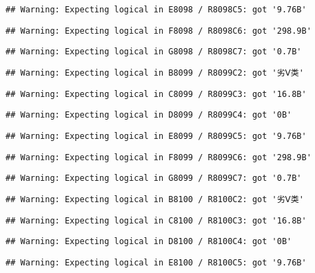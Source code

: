 \documentclass[
]{article}
\begin{document}
\begin{verbatim}
## Warning: Expecting logical in E8098 / R8098C5: got '9.76B'
\end{verbatim}

\begin{verbatim}
## Warning: Expecting logical in F8098 / R8098C6: got '298.9B'
\end{verbatim}

\begin{verbatim}
## Warning: Expecting logical in G8098 / R8098C7: got '0.7B'
\end{verbatim}

\begin{verbatim}
## Warning: Expecting logical in B8099 / R8099C2: got '劣Ⅴ类'
\end{verbatim}

\begin{verbatim}
## Warning: Expecting logical in C8099 / R8099C3: got '16.8B'
\end{verbatim}

\begin{verbatim}
## Warning: Expecting logical in D8099 / R8099C4: got '0B'
\end{verbatim}

\begin{verbatim}
## Warning: Expecting logical in E8099 / R8099C5: got '9.76B'
\end{verbatim}

\begin{verbatim}
## Warning: Expecting logical in F8099 / R8099C6: got '298.9B'
\end{verbatim}

\begin{verbatim}
## Warning: Expecting logical in G8099 / R8099C7: got '0.7B'
\end{verbatim}

\begin{verbatim}
## Warning: Expecting logical in B8100 / R8100C2: got '劣Ⅴ类'
\end{verbatim}

\begin{verbatim}
## Warning: Expecting logical in C8100 / R8100C3: got '16.8B'
\end{verbatim}

\begin{verbatim}
## Warning: Expecting logical in D8100 / R8100C4: got '0B'
\end{verbatim}

\begin{verbatim}
## Warning: Expecting logical in E8100 / R8100C5: got '9.76B'
\end{verbatim}
\end{document}
